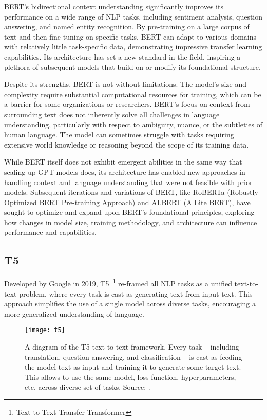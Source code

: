BERT's bidirectional context understanding significantly improves its performance on a wide range of NLP tasks, including sentiment analysis, question answering, and named entity recognition.
By pre-training on a large corpus of text and then fine-tuning on specific tasks, BERT can adapt to various domains with relatively little task-specific data, demonstrating impressive transfer learning capabilities.
Its architecture has set a new standard in the field, inspiring a plethora of subsequent models that build on or modify its foundational structure.

Despite its strengths, BERT is not without limitations.
The model's size and complexity require substantial computational resources for training, which can be a barrier for some organizations or researchers.
BERT's focus on context from surrounding text does not inherently solve all challenges in language understanding, particularly with respect to ambiguity, nuance, or the subtleties of human language.
The model can sometimes struggle with tasks requiring extensive world knowledge or reasoning beyond the scope of its training data.

While BERT itself does not exhibit emergent abilities in the same way that scaling up GPT models does, its architecture has enabled new approaches in handling context and language understanding that were not feasible with prior models.
Subsequent iterations and variations of BERT, like RoBERTa (Robustly Optimized BERT Pre-training Approach) and ALBERT (A Lite BERT), have sought to optimize and expand upon BERT's foundational principles, exploring how changes in model size, training methodology, and architecture can influence performance and capabilities.

\subsection{T5}
\label{subsec:t5}

Developed by Google in 2019, T5~\footnote{Text-to-Text Transfer Transformer} re-framed all NLP tasks as a unified text-to-text problem, where every task is cast as generating text from input text.
This approach simplifies the use of a single model across diverse tasks, encouraging a more generalized understanding of language.

\begin{figure}[h!]
    \centering
    \texttt{[image: t5]}
    \caption{A diagram of the T5 text-to-text framework. Every task -- including translation, question answering, and classification -- is cast as feeding the model text as input and training it to generate some target text. This allows to use the same model, loss function, hyperparameters, etc. across diverse set of tasks. Source: \protect\cite{t5}.}
    \label{fig:t5-t2t}
\end{figure}

